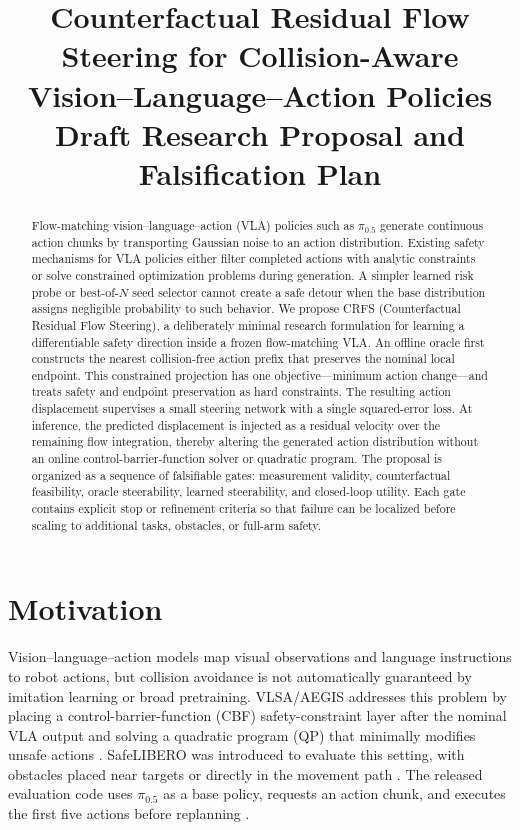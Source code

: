 \documentclass[10pt,conference]{IEEEtran}
\title{Counterfactual Residual Flow Steering for Collision-Aware Vision--Language--Action Policies\\
\large Draft Research Proposal and Falsification Plan}
\author{\IEEEauthorblockN{Anonymous Draft}
\IEEEauthorblockA{Replace with author names and affiliations before submission}}
\newcommand{\method}{\textsc{CRFS}}
\newcommand{\pizero}{\ensuremath{\pi_{0.5}}}
\newcommand{\1}{\mathbf{1}}
\begin{document}
\maketitle

\begin{abstract}
Flow-matching vision--language--action (VLA) policies such as \pizero{} generate continuous action chunks by transporting Gaussian noise to an action distribution. Existing safety mechanisms for VLA policies either filter completed actions with analytic constraints or solve constrained optimization problems during generation. A simpler learned risk probe or best-of-$N$ seed selector cannot create a safe detour when the base distribution assigns negligible probability to such behavior. We propose \method{} (Counterfactual Residual Flow Steering), a deliberately minimal research formulation for learning a differentiable safety direction inside a frozen flow-matching VLA. An offline oracle first constructs the nearest collision-free action prefix that preserves the nominal local endpoint. This constrained projection has one objective---minimum action change---and treats safety and endpoint preservation as hard constraints. The resulting action displacement supervises a small steering network with a single squared-error loss. At inference, the predicted displacement is injected as a residual velocity over the remaining flow integration, thereby altering the generated action distribution without an online control-barrier-function solver or quadratic program. The proposal is organized as a sequence of falsifiable gates: measurement validity, counterfactual feasibility, oracle steerability, learned steerability, and closed-loop utility. Each gate contains explicit stop or refinement criteria so that failure can be localized before scaling to additional tasks, obstacles, or full-arm safety.
\end{abstract}

\section{Motivation}

Vision--language--action models map visual observations and language instructions to robot actions, but collision avoidance is not automatically guaranteed by imitation learning or broad pretraining. VLSA/AEGIS addresses this problem by placing a control-barrier-function (CBF) safety-constraint layer after the nominal VLA output and solving a quadratic program (QP) that minimally modifies unsafe actions \cite{hu2025vlsa}. SafeLIBERO was introduced to evaluate this setting, with obstacles placed near targets or directly in the movement path \cite{hu2025vlsa}. The released evaluation code uses \pizero{} as a base policy, requests an action chunk, and executes the first five actions before replanning \cite{vlsarepo}.
\end{document}
